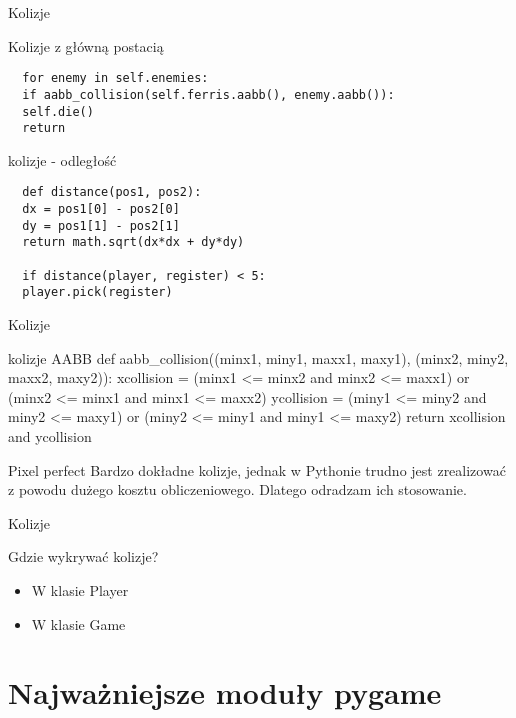 \documentclass{beamer}
\begin{document}
\begin{frame}[fragile]{Kolizje}
  \begin{exampleblock}{Kolizje z główną postacią}
\begin{verbatim}
  for enemy in self.enemies:
  if aabb_collision(self.ferris.aabb(), enemy.aabb()):
  self.die()
  return
\end{verbatim}
  \end{exampleblock}

  \begin{exampleblock}{kolizje - odległość}
\begin{verbatim}
  def distance(pos1, pos2):
  dx = pos1[0] - pos2[0]
  dy = pos1[1] - pos2[1]
  return math.sqrt(dx*dx + dy*dy)

  if distance(player, register) < 5:
  player.pick(register)
\end{verbatim}
  \end{exampleblock}
\end{frame}

\begin{frame}{Kolizje}
  \begin{exampleblock}{kolizje AABB}
    def aabb\_collision((minx1, miny1, maxx1, maxy1), (minx2, miny2, maxx2, maxy2)):
      xcollision = (minx1 <= minx2 and minx2 <= maxx1) or (minx2 <= minx1 and minx1 <= maxx2)
      ycollision = (miny1 <= miny2 and miny2 <= maxy1) or (miny2 <= miny1 and miny1 <= maxy2)
      return xcollision and ycollision
  \end{exampleblock}

  \begin{block}{Pixel perfect}
    Bardzo dokładne kolizje, jednak w Pythonie trudno jest zrealizować
    z powodu dużego kosztu obliczeniowego. Dlatego odradzam ich
    stosowanie.
  \end{block}

\end{frame}


\begin{frame}{Kolizje}
  \begin{block}{Gdzie wykrywać kolizje?}
      \begin{itemize}
      \item W klasie Player
      \item W klasie Game
      \end{itemize}
  \end{block}
\end{frame}

\section{Najważniejsze moduły pygame}
\end{document}

